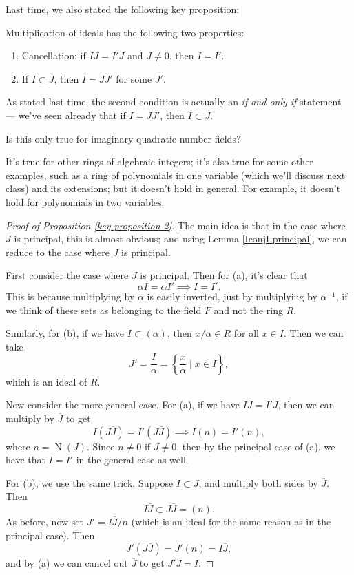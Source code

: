 Last time, we also stated the following key proposition:
\begin{proposition} \label{key proposition 2}
    Multiplication of ideals has the following two properties:
    \begin{enumerate}[label = (\alph*)]
        \item Cancellation: if $IJ = I'J$ and $J \neq 0$, then $I = I'$. 
        \item If $I \subset J$, then $I = JJ'$ for some $J'$. 
    \end{enumerate}
\end{proposition}

As stated last time, the second condition is actually an \emph{if and only if} statement --- we've seen already that if $I = JJ'$, then $I \subset J$. 

\begin{question}
    Is this only true for imaginary quadratic number fields? 
\end{question}

\begin{ans}
It's true for other rings of algebraic integers; it's also true for some other examples, such as a ring of polynomials in one variable (which we'll discuss next class) and its extensions; but it doesn't hold in general. For example, it doesn't hold for polynomials in two variables. 
\end{ans}

\begin{proof}[Proof of Proposition \ref{key proposition 2}]
    The main idea is that in the case where $J$ is principal, this is almost obvious; and using Lemma \ref{IconjI principal}, we can reduce to the case where $J$ is principal.

    First consider the case where $J$ is principal. Then for (a), it's clear that \[\alpha I = \alpha I' \implies I = I'.\] This is because multiplying by $\alpha$ is easily inverted, just by multiplying by $\alpha^{-1}$, if we think of these sets as belonging to the field $F$ and not the ring $R$. 

    Similarly, for (b), if we have $I \subset (\alpha)$, then $x/\alpha \in R$ for all $x \in I$. Then we can take \[J' = \frac{I}{\alpha} = \left\{\frac{x}{\alpha} \mid x \in I\right\},\] which is an ideal of $R$.

    Now consider the more general case. For (a), if we have $IJ = I'J$, then we can multiply by $\overline{J}$ to get \[I(J\overline{J}) = I'(J\overline{J}) \implies I(n) = I'(n),\] where $n = \operatorname{N}(J)$. Since $n \neq 0$ if $J \neq 0$, then by the principal case of (a), we have that $I = I'$ in the general case as well. 

    For (b), we use the same trick. Suppose $I \subset J$, and multiply both sides by $\overline{J}$. Then \[I\overline{J} \subset J\overline{J} = (n).\] As before, now set $J' = I\overline{J}/n$ (which is an ideal for the same reason as in the principal case). Then \[J'(J\overline{J}) = J'(n) = I\overline{J},\] and by (a) we can cancel out $\overline{J}$ to get $J'J = I$. 
\end{proof}

